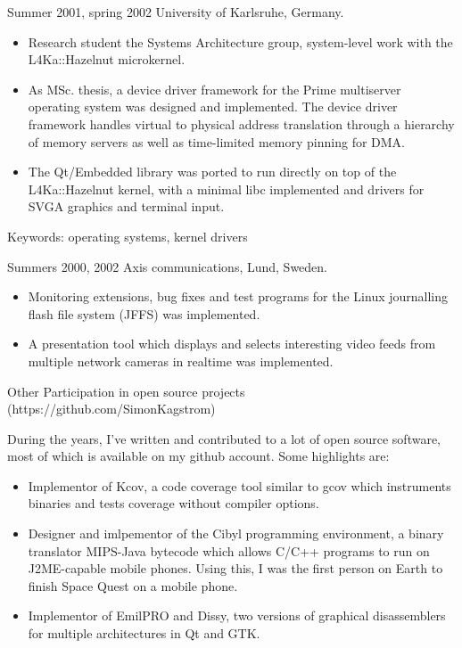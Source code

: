 \documentclass[a4paper]{article}
\begin{document}
\begin{CV}
\item[Summer 2001, spring 2002] University of Karlsruhe, Germany.
  \begin{itemize}
  \item Research student the Systems Architecture group, system-level work
    with the L4Ka::Hazelnut microkernel.
  \item As MSc. thesis, a device driver framework for the Prime multiserver
    operating system was designed and implemented. The device driver framework
    handles virtual to physical address translation through a hierarchy of
    memory servers as well as time-limited memory pinning for DMA.
  \item The Qt/Embedded library was ported to run directly on top of the
    L4Ka::Hazelnut kernel, with a minimal libc implemented and drivers for
    SVGA graphics and terminal input.
  \end{itemize}
Keywords: operating systems, kernel drivers


\item[Summers 2000, 2002] Axis communications, Lund, Sweden.
  \begin{itemize}
  \item Monitoring extensions, bug fixes and test programs for the Linux journalling
    flash file system (JFFS) was implemented.
  \item A presentation tool which displays and selects interesting video feeds
    from multiple network cameras in realtime was implemented.
  \end{itemize}

\item[Other] Participation in open source projects (https://github.com/SimonKagstrom)

During the years, I've written and contributed to a lot of open source software, most
of which is available on my github account. Some highlights are:

  \begin{itemize}
    \item Implementor of Kcov, a code coverage tool similar to gcov
      which instruments binaries and tests coverage without compiler
      options.
    \item Designer and imlpementor of the Cibyl programming environment, a
      binary translator MIPS-Java bytecode which allows C/C++ programs
      to run on J2ME-capable mobile phones. Using this, I was the first person
      on Earth to finish Space Quest on a mobile phone.
    \item Implementor of EmilPRO and Dissy, two versions of graphical disassemblers for
      multiple architectures in Qt and GTK.
  \end{itemize}
\end{CV}
%
\end{document}

